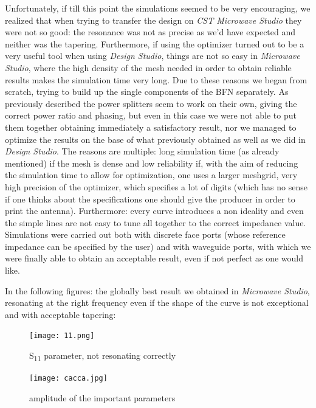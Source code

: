 Unfortunately, if till this point the simulations seemed to be very encouraging, we realized that when trying to transfer the design on \textit{CST Microwave Studio} they were not so good: the resonance was not as precise as we'd have expected and neither was the tapering. Furthermore, if using the optimizer turned out to be a very useful tool when using \textit{Design Studio}, things are not so easy in \textit{Microwave Studio}, where the high density of the mesh needed in order to obtain reliable results makes the simulation time very long. Due to these reasons we began from scratch, trying to build up the single components of the BFN separately. As previously described the power splitters seem to work on their own, giving the correct power ratio and phasing, but even in this case we were not able to put them together obtaining immediately a satisfactory result, nor we managed to optimize the results on the base of what previously obtained as well as we did in \textit{Design Studio}. The reasons are multiple: long simulation time (as already mentioned) if the mesh is dense and low reliability if, with the aim of reducing the simulation time to allow for optimization, one uses a larger meshgrid, very high precision of the optimizer, which specifies a lot of digits (which has no sense if one thinks about the specifications one should give the producer in order to print the antenna). Furthermore: every curve introduces a non ideality and even the simple lines are not easy to tune all together to the correct impedance value. Simulations were carried out both with discrete face ports (whose reference impedance can be specified by the user) and with waveguide ports, with which we were finally able to obtain an acceptable result, even if not perfect as one would like.
\par\medskip
\noindent

In the following figures: the globally best result we obtained in \textit{Microwave Studio}, resonating at the right frequency even if the shape of the curve is not exceptional and with acceptable tapering:

\begin{figure}[H]
\centering
\texttt{[image: 11.png]}
\caption{S\textsubscript{11} parameter, not resonating correctly}
\label{a}
\end{figure}

\begin{figure}[H]
\centering
\texttt{[image: cacca.jpg]}
\caption{amplitude of the important parameters}
\label{a}
\end{figure}

